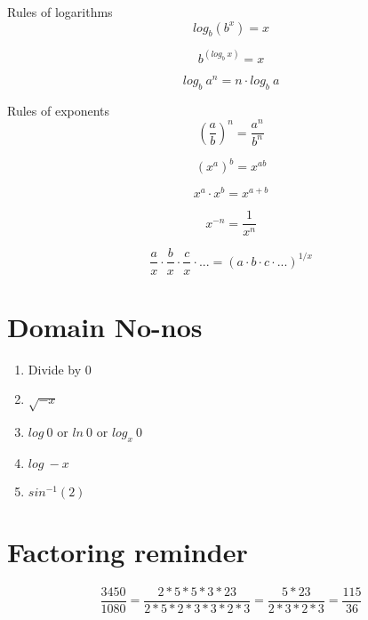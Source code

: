 \documentclass[12pt, english]{article}
\begin{document}
Rules of logarithms 
\begin{equation}
	log_b (b^x) = x
\end{equation}

\begin{equation}
	b^{(log_{b}\ x)} = x
\end{equation}

\begin{equation}
	log_{b}\ a^n = n \cdot log_b\ a
\end{equation}

Rules of exponents 
\begin{equation}
	\left(
		\frac{a}{b}
	\right)
		^n = \frac{a^n}{b^n}
\end{equation}

\begin{equation}
	(x^a)^b = x^{ab}
\end{equation}

\begin{equation}
	x^a \cdot x^b = x^{a + b}
\end{equation}

\begin{equation}
	x^{-n} = \frac{1}{x^n}
\end{equation}

\begin{equation}
	\frac{a}{x} \cdot \frac{b}{x} \cdot \frac{c}{x} \cdot ... = (a \cdot b \cdot c \cdot ...)^{1/x}
\end{equation}

\section{Domain No-nos}
\begin{enumerate}
\item Divide by 0
\item $\sqrt{-x}$
\item $log\ 0$ or $ln\ 0$ or $log_x\ 0$
\item $log\ -x$
\item $sin^{-1}(2)$
\end{enumerate}

\section{Factoring reminder}
\begin{equation}
	\frac{3450}{1080} = \frac{2*5*5*3*23}{2*5*2*3*3*2*3} = \frac{5*23}{2*3*2*3} = \frac{115}{36}
\end{equation}
\end{document}
